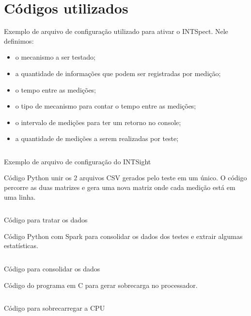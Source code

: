 \chapter{Códigos utilizados}

Exemplo de arquivo de configuração utilizado para ativar o INTSpect. Nele definimos:

\begin{itemize}
    \item o mecanismo a ser testado;
    \item a quantidade de informações que podem ser registradas por medição;
    \item o tempo entre as medições;
    \item o tipo de mecanismo para contar o tempo entre as medições;
    \item o intervalo de medições para ter um retorno no console;
    \item a quantidade de medições a serem realizadas por teste;
\end{itemize}

\begin{listing}[!htb]
\inputminted[linenos,tabsize=2,breaklines]{ini}{codigos/softirq}
\caption{Exemplo de arquivo de configuração do INTSight}
\label{codigo:config}
\end{listing}

\newpage
Código Python unir os 2 arquivos CSV gerados pelo teste em um único. O código percorre as duas matrizes e gera uma nova matriz onde cada medição está em uma linha.

\begin{listing}[!htb]
\inputminted[linenos,tabsize=2,breaklines]{python}{codigos/tidy-chunk-result.py}
\caption{Código para tratar os dados}
\label{codigo:consolidate}
\end{listing}

\newpage
Código Python com Spark para consolidar os dados dos testes e extrair algumas estatísticas.

\begin{listing}[!htb]
\inputminted[linenos,tabsize=2,breaklines]{python}{codigos/summary-pyspark.py}
\caption{Código para consolidar os dados}
\label{codigo:summary}
\end{listing}

\newpage
Código do programa em C para gerar sobrecarga no processador.

\begin{listing}[!htb]
\inputminted[linenos,tabsize=2,breaklines]{c}{codigos/cpuload.c}
\caption{Código para sobrecarregar a CPU}
\label{codigo:sobrecarga}
\end{listing}
